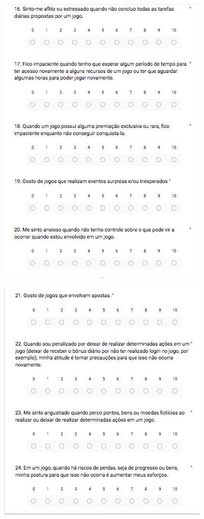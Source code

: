 \begin{apendicesenv}
\begin{figure}[h]
	\centering
	\includegraphics[keepaspectratio=true,scale=0.9]{figuras/q9.png}
\end{figure}

\begin{figure}[h]
	\centering
	\includegraphics[keepaspectratio=true,scale=0.9]{figuras/q10.png}
\end{figure}

\end{apendicesenv}
